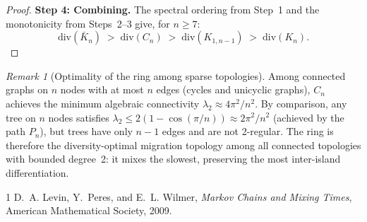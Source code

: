 \documentclass[10pt]{article}
\theoremstyle{remark}
\newtheorem{remark}[theorem]{Remark}
\begin{document}
\begin{proof}
\textbf{Step 4: Combining.}
The spectral ordering from Step~1 and the monotonicity from Steps~2--3
give, for $n \geq 7$:
\[
  \mathrm{div}(\bar{K}_n)
  \;>\; \mathrm{div}(C_n)
  \;>\; \mathrm{div}(K_{1,n-1})
  \;>\; \mathrm{div}(K_n).
\]
\end{proof}

\begin{remark}[Optimality of the ring among sparse topologies]
Among connected graphs on $n$ nodes with at most $n$ edges (cycles and
unicyclic graphs), $C_n$ achieves the minimum algebraic connectivity
$\lambda_2 \approx 4\pi^2/n^2$. By comparison, any tree on $n$ nodes
satisfies $\lambda_2 \leq 2(1 - \cos(\pi/n)) \approx 2\pi^2/n^2$
(achieved by the path $P_n$), but trees have only $n-1$ edges and are not
2-regular. The ring is therefore the diversity-optimal migration topology
among all connected topologies with bounded degree~2: it mixes the slowest,
preserving the most inter-island differentiation.
\end{remark}

\begin{thebibliography}{1}
D.~A. Levin, Y.~Peres, and E.~L. Wilmer,
\textit{Markov Chains and Mixing Times},
American Mathematical Society, 2009.
\end{thebibliography}
\end{document}
